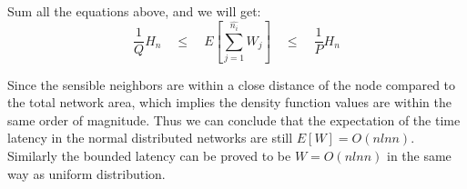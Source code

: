 Sum all the equations above, and we will get:
$$
\frac{1}{Q}H_n  \quad \leq \quad E[\sum_{j=1}^{\hat{n_i}}W_j]  \quad \leq \quad \frac{1}{P}H_n
$$

Since the sensible neighbors are within a close distance of the node 
compared to the total network area, 
which implies the density function values are within the same order of magnitude.
Thus we can conclude that the expectation of the time latency in the normal 
distributed networks are still $E[W]=O(nlnn)$.
Similarly the bounded latency can be proved to be $W=O(nlnn)$ in the same way as
uniform distribution.



